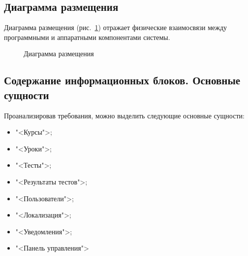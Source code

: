 \subsection{Диаграмма размещения}

Диаграмма размещения (рис.~\ref{place:image}) отражает физические взаимосвязи между программными и аппаратными компонентами системы.

\vspace{-8mm} %
\begin{figure}[ht]
\caption{Диаграмма размещения}
\label{place:image}
\end{figure}

\subsection{Содержание информационных блоков. Основные сущности}

Проанализировав требования, можно выделить следующие основные сущности:
\begin{itemize}
  \item "<Курсы">;
  \item "<Уроки">;
  \item "<Тесты">;
  \item "<Результаты тестов">;
  \item "<Пользователи">;
  \item "<Локализация">;
  \item "<Уведомления">;
  \item "<Панель управления">
\end{itemize}

